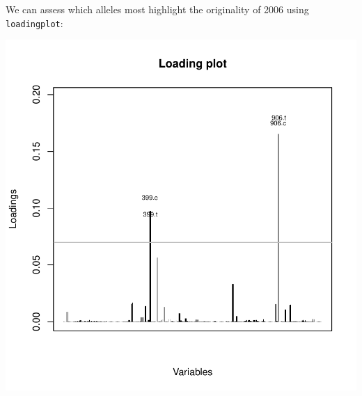 \documentclass{article}
\begin{document}
We can assess which alleles most highlight the originality of 2006 using \texttt{loadingplot}:
\begin{Schunk}
\end{Schunk}
\includegraphics{figs/dapc-018}
\end{document}
